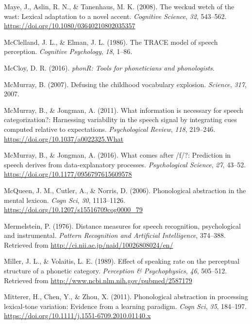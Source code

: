 \documentclass[
  11pt,
  english,
  man,floatsintext]{apa6}
\newlength{\cslhangindent}
\newlength{\cslentryspacingunit} %
\newenvironment{CSLReferences}[2] %
 {%
  \setlength{\parindent}{0pt}
  \ifodd #1
  \let\oldpar\par
  \def\par{\hangindent=\cslhangindent\oldpar}
  \fi
  \setlength{\parskip}{#2\cslentryspacingunit}
 }%
 {}
\begin{document}
\begin{CSLReferences}{1}{0}
\leavevmode{}%
Maye, J., Aslin, R. N., \& Tanenhaus, M. K. (2008). The weckud wetch of the wast: Lexical adaptation to a novel accent. \emph{Cognitive Science}, \emph{32}, 543--562. \url{https://doi.org/10.1080/03640210802035357}

\leavevmode{}%
McClelland, J. L., \& Elman, J. L. (1986). The TRACE model of speech perception. \emph{Cognitive Psychology}, \emph{18}, 1--86.

\leavevmode{}%
McCloy, D. R. (2016). \emph{phonR: Tools for phoneticians and phonologists}.

\leavevmode{}%
McMurray, B. (2007). Defusing the childhood vocabulary explosion. \emph{Science}, \emph{317}, 2007.

\leavevmode{}%
McMurray, B., \& Jongman, A. (2011). What information is necessary for speech categorization?: Harnessing variability in the speech signal by integrating cues computed relative to expectations. \emph{Psychological Review}, \emph{118}, 219--246. \url{https://doi.org/10.1037/a0022325.What}

\leavevmode{}%
McMurray, B., \& Jongman, A. (2016). What comes after /f/?: Prediction in speech derives from data-explanatory processes. \emph{Psychological Science}, \emph{27}, 43--52. \url{https://doi.org/10.1177/0956797615609578}

\leavevmode{}%
McQueen, J. M., Cutler, A., \& Norris, D. (2006). Phonological abstraction in the mental lexicon. \emph{Cogn Sci}, \emph{30}, 1113--1126. \url{https://doi.org/10.1207/s15516709cog0000_79}

\leavevmode{}%
Mermelstein, P. (1976). Distance measures for speech recognition, psychological and instrumental. \emph{Pattern Recognition and Artificial Intelligence}, 374--388. Retrieved from \url{http://ci.nii.ac.jp/naid/10026808024/en/}

\leavevmode{}%
Miller, J. L., \& Volaitis, L. E. (1989). Effect of speaking rate on the perceptual structure of a phonetic category. \emph{Perception \& Psychophysics}, \emph{46}, 505--512. Retrieved from \url{http://www.ncbi.nlm.nih.gov/pubmed/2587179}

\leavevmode{}%
Mitterer, H., Chen, Y., \& Zhou, X. (2011). Phonological abstraction in processing lexical-tone variation: Evidence from a learning paradigm. \emph{Cogn Sci}, \emph{35}, 184--197. \url{https://doi.org/10.1111/j.1551-6709.2010.01140.x}


\end{CSLReferences}
\end{document}
